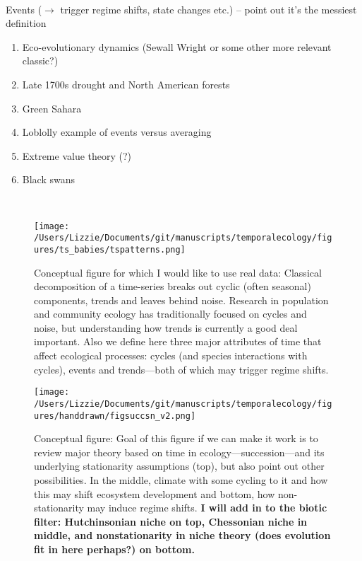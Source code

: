 \documentclass[11pt,a4paper]{article}
\begin{document}
 \\
\noindent Events (\(\rightarrow\) trigger regime shifts, state changes etc.) -- point out it's the messiest definition\\
\begin{enumerate}
\item Eco-evolutionary dynamics (Sewall Wright or some other more relevant classic?)
\item Late 1700s drought and North American forests
\item Green Sahara
\item Loblolly example of events versus averaging
\item Extreme value theory (?)
\item Black swans
\end{enumerate}
\\
\newpage
\begin{figure}[h!]
\centering
\noindent \texttt{[image: /Users/Lizzie/Documents/git/manuscripts/temporalecology/figures/ts\_babies/tspatterns.png]}
\caption{Conceptual figure for which I would like to use real data: Classical decomposition of a time-series breaks out cyclic (often seasonal) components, trends and leaves behind noise. Research in population and community ecology has traditionally focused on cycles and noise, but understanding how trends is currently a good deal important. Also we define here three major attributes of time that affect ecological processes: cycles (and species interactions with cycles), events and trends---both of which may trigger regime shifts. \label{decompfig}}
\end{figure}

\begin{figure}[h!]
\centering
\noindent \texttt{[image: /Users/Lizzie/Documents/git/manuscripts/temporalecology/figures/handdrawn/figsuccsn\_v2.png]}
\caption{Conceptual figure: Goal of this figure if we can make it work is to review major theory based on time in ecology---succession---and its underlying stationarity assumptions (top), but also point out other possibilities. In the middle, climate with some cycling to it and how this may shift ecosystem development  and bottom, how non-stationarity may induce regime shifts. {\bf I will add in to the biotic filter: Hutchinsonian niche on top, Chessonian niche in middle, and nonstationarity in niche theory (does evolution fit in here perhaps?) on bottom.} \label{successfig}}
\end{figure}
\end{document}
